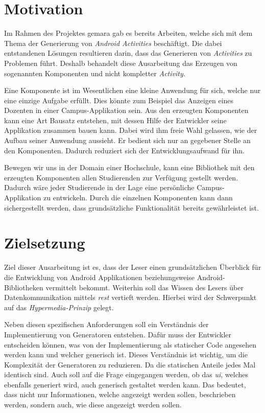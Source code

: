 \section{Motivation}\label{sec:motivation}
Im Rahmen des Projektes \ac{gemara} gab es bereits Arbeiten, welche sich mit dem Thema der Generierung von \textit{Android Activities} beschäftigt. Die dabei entstandenen Lösungen resultieren darin, dass das Generieren von \textit{Activities} zu Problemen führt. Deshalb behandelt diese Ausarbeitung das Erzeugen von sogenannten Komponenten und nicht kompletter \textit{Activity}.

Eine Komponente ist im Wesentlichen eine kleine Anwendung für sich, welche nur eine einzige Aufgabe erfüllt. Dies könnte zum Beispiel das Anzeigen eines Dozenten in einer Campus-Applikation sein.
Aus den erzeugten Komponenten kann eine Art Bausatz entstehen, mit dessen Hilfe der Entwickler seine Applikation zusammen bauen kann. Dabei wird ihm freie Wahl gelassen, wie der Aufbau seiner Anwendung aussieht. Er bedient sich nur an gegebener Stelle an den Komponenten. Dadurch reduziert sich der Entwicklungsaufwand für ihn.

Bewegen wir uns in der Domain einer Hochschule, kann eine Bibliothek mit den erzeugten Komponenten allen Studierenden zur Verfügung gestellt werden. Dadurch wäre jeder Studierende in der Lage eine persönliche Campus-Applikation zu entwickeln. Durch die einzelnen Komponenten kann dann sichergestellt werden, dass grundsätzliche Funktionalität bereits gewährleistet ist.

\section{Zielsetzung}\label{sec:target}
Ziel dieser Ausarbeitung ist es, dass der Leser einen grundsätzlichen Überblick für die Entwicklung von Android Applikationen beziehungsweise Android-Bibliotheken vermittelt bekommt. Weiterhin soll das Wissen des Lesers über Datenkommunikation mittels \textit{\acf{rest}} vertieft werden. Hierbei wird der Schwerpunkt auf das \textit{Hypermedia-Prinzip} gelegt. 

Neben diesen spezifischen Anforderungen soll ein Verständnis der Implementierung von Generatoren entstehen. Dafür muss der Entwickler entscheiden können, was von der Implementierung als statischer Code angesehen werden kann und welcher generisch ist. Dieses Verständnis ist wichtig, um die Komplexität der Generatoren zu reduzieren. Da die statischen Anteile jedes Mal identisch sind.
Auch soll auf die Frage eingegangen werden, ob das \textit{\ac{ui}}, welches ebenfalls generiert wird, auch generisch gestaltet werden kann. Das bedeutet, dass nicht nur Informationen, welche angezeigt werden sollen, beschrieben werden, sondern auch, wie diese angezeigt werden sollen.

